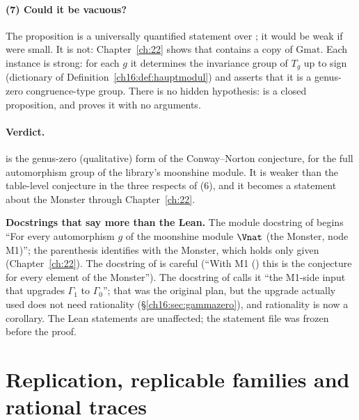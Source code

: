 \paragraph{(7) Could it be vacuous?}  The proposition is a universally quantified statement over ; it
would be weak if  were small.  It is not: Chapter~\ref{ch:22} shows that  contains a copy
of $\mathrm{Gmat}$.  Each instance is strong: for each $g$ it determines the invariance group of $T_g$ up to sign
(dictionary of Definition~\ref{ch16:def:hauptmodul}) and asserts that it is a genus-zero congruence-type group.  There
is no hidden hypothesis:  is a closed proposition, and  proves it with
no arguments.

\paragraph{Verdict.}   is the genus-zero (qualitative) form of the Conway--Norton
conjecture, for the full automorphism group of the library's moonshine module.  It is weaker than the table-level
conjecture in the three respects of (6), and it becomes a statement about the Monster through Chapter~\ref{ch:22}.

\begin{warning}
\textbf{Docstrings that say more than the Lean.}  The module docstring of
 begins ``For every automorphism $g$ of the moonshine module
$\Vnat$ (the Monster, node M1)''; the parenthesis identifies  with the Monster, which holds only given
 (Chapter~\ref{ch:22}).  The docstring of  is careful (``With M1
() this is the conjecture for every element of the Monster'').  The docstring of
 calls it ``the M1-side input that upgrades $\Gamma_1$ to $\Gamma_0$''; that was the original plan, but the upgrade actually used does not need rationality (\S\ref{ch16:sec:gammazero}), and rationality
is now a corollary.  The Lean statements are unaffected; the statement file was frozen before the proof.
\end{warning}


\section{Replication, replicable families and rational traces}\label{ch16:sec:replication}

